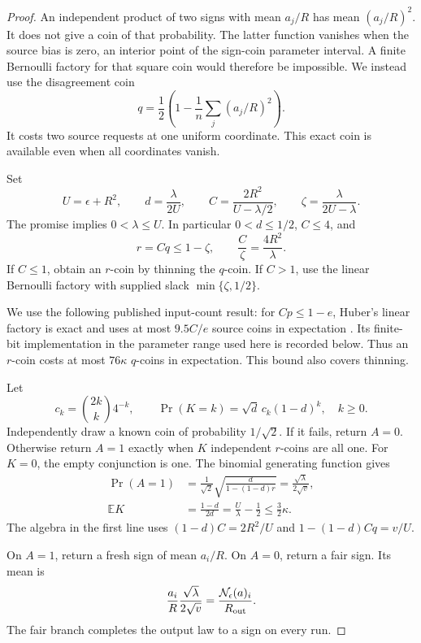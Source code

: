 \begin{proof}
An independent product of two signs with mean $a_j/R$ has mean
$(a_j/R)^2$. It does not give a coin of that probability. The latter
function vanishes when the source bias is zero, an interior point of
the sign-coin parameter interval. A finite Bernoulli factory for that
square coin would therefore be impossible. We instead use the
disagreement coin
\[
 q=\frac12\left(1-\frac1n\sum_j(a_j/R)^2\right).
\]
It costs two source requests at one uniform coordinate. This exact
coin is available even when all coordinates vanish.

Set
\begin{equation}
 U=\epsilon+R^2,\qquad
 d=\frac{\lambda}{2U},\qquad
 C=\frac{2R^2}{U-\lambda/2},\qquad
 \zeta=\frac{\lambda}{2U-\lambda}.
 \label{eq:rmsparameters}
\end{equation}
The promise implies $0<\lambda\le U$. In particular $0<d\le1/2$,
$C\le4$, and
\begin{equation}
 r=Cq\le1-\zeta,
 \qquad \frac C\zeta=\frac{4R^2}{\lambda}.
 \label{eq:rmsamplifier}
\end{equation}
If $C\le1$, obtain an $r$-coin by thinning the $q$-coin. If $C>1$,
use the linear Bernoulli factory with supplied slack
$\min\{\zeta,1/2\}$.

We use the following published input-count result: for $Cp\le1-e$,
Huber's linear factory is exact and uses at most $9.5C/e$ source
coins in expectation \cite[Theorem~1]{huber2016linear}. Its
finite-bit implementation in the parameter range used here is
recorded below. Thus an $r$-coin costs at most $76\kappa$ $q$-coins
in expectation. This bound also covers thinning.

Let
\[
 c_k=\binom{2k}{k}4^{-k},\qquad
 \Pr(K=k)=\sqrt d\,c_k(1-d)^k,\quad k\ge0.
\]
Independently draw a known coin of probability $1/\sqrt2$. If it
fails, return $A=0$. Otherwise return $A=1$ exactly when $K$
independent $r$-coins are all one. For $K=0$, the empty conjunction
is one. The binomial generating function gives
\begin{align}
 \Pr(A=1)
 &=\frac1{\sqrt2}
   \sqrt{\frac d{1-(1-d)r}}
   =\frac{\sqrt\lambda}{2\sqrt v},
 \label{eq:rmsattenuation}\\
 \mathbb E K
 &=\frac{1-d}{2d}
   =\frac U\lambda-\frac12
   \le\frac32\kappa.
 \label{eq:rmsarity}
\end{align}
The algebra in the first line uses
$(1-d)C=2R^2/U$ and
$1-(1-d)Cq=v/U$.

On $A=1$, return a fresh sign of mean $a_i/R$. On $A=0$, return
a fair sign. Its mean is
\[
 \frac{a_i}{R}\frac{\sqrt\lambda}{2\sqrt v}
 =\frac{\mathcal N_\epsilon(a)_i}{R_{\rm out}}.
\]
The fair branch completes the output law to a sign on every run.


\end{proof}
